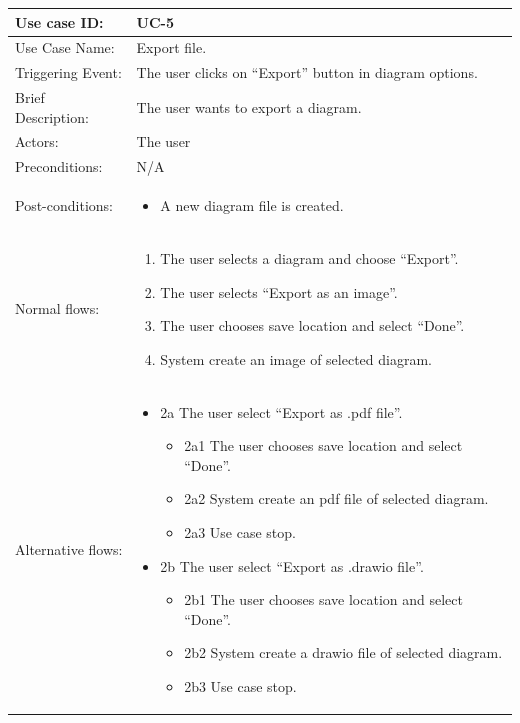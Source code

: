 \begin{table}[]
\begin{tabular}{| m{4cm} | m{11cm} |}
\hline
Use case ID:       & UC-5 \\ \hline
Use Case Name:     & Export file. \\ \hline
Triggering Event:  & The user clicks on “Export” button in diagram options. \\ \hline
Brief Description: & The user wants to export a diagram. \\ \hline
Actors:            & The user \\ \hline
Preconditions:     & N/A\\ \hline
Post-conditions:   & \begin{itemize}
    \item A new diagram file is created.
\end{itemize} \\ \hline
Normal flows:      & \begin{enumerate}
    \item The user selects a diagram and choose “Export”.
    \item The user selects “Export as an image”.
    \item The user chooses save location and select “Done”.
    \item System create an image of selected diagram.
\end{enumerate} \\ \hline
Alternative flows: & \begin{itemize}
    \item {2a The user select “Export as .pdf file”.}
    \begin{itemize}
        \item 2a1 The user chooses save location and select “Done”.
        \item 2a2 System create an pdf file of selected diagram.
        \item 2a3 Use case stop.
    \end{itemize}
    \item {2b The user select “Export as .drawio file”.}
    \begin{itemize}
        \item 2b1 The user chooses save location and select “Done”.
        \item 2b2 System create a drawio file of selected diagram.
        \item 2b3 Use case stop.
    \end{itemize}
\end{itemize} \\ \hline

\end{tabular}
\end{table}
